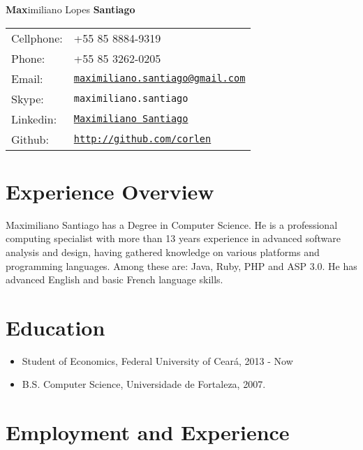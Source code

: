 \documentclass[letterpaper]{article}
\def\name{\textbf{Max}imiliano Lopes \textbf{Santiago}}
\begin{document}
\begin{flushright}

{\huge \name}


\vspace{0.25in}
\begin{minipage}{0.45\linewidth}
  \begin{tabular}{ll}
    Cellphone: & +55 85 8884-9319 \\
    Phone: &  +55 85 3262-0205 \\
    Email: & \href{mailto:maximiliano.santiago@gmail.com}{\tt maximiliano.santiago@gmail.com} \\
    Skype: & \tt maximiliano.santiago \\
    Linkedin: & \href{http://www.linkedin.com/pub/maximiliano-santiago/a/145/b2a}{\tt Maximiliano Santiago} \\
	  Github: & \href{http://github.com/corlen}{\tt http://github.com/corlen} \\
  \end{tabular}
\end{minipage}
\end{flushright}
\section*{Experience Overview}

Maximiliano Santiago has a Degree in Computer Science. He is a professional computing
specialist with more than 13 years experience in advanced software analysis and design,
having gathered knowledge on various platforms and programming languages. Among these
are: Java, Ruby, PHP and ASP 3.0.
He has advanced English and basic French language skills.

\section*{Education}

\begin{itemize}
  \item Student of Economics, Federal University of Ceará, 2013 - Now
  \item B.S. Computer Science, Universidade de Fortaleza, 2007.
\end{itemize}

\section*{Employment and Experience}
\end{document}
